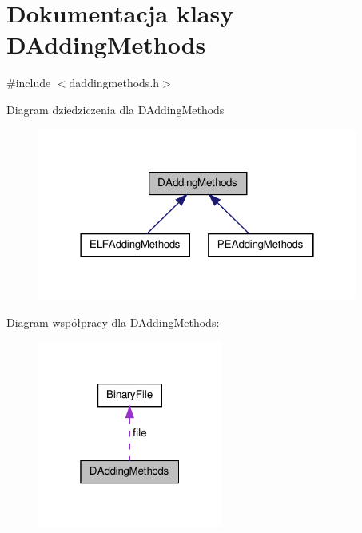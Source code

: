 \hypertarget{class_d_adding_methods}{\section{Dokumentacja klasy D\-Adding\-Methods}
\label{class_d_adding_methods}
}


{\ttfamily \#include $<$daddingmethods.\-h$>$}



Diagram dziedziczenia dla D\-Adding\-Methods\nopagebreak
\begin{figure}[H]
\begin{center}
\leavevmode
\includegraphics[width=298pt]{class_d_adding_methods__inherit__graph}
\end{center}
\end{figure}


Diagram współpracy dla D\-Adding\-Methods\-:\nopagebreak
\begin{figure}[H]
\begin{center}
\leavevmode
\includegraphics[width=172pt]{class_d_adding_methods__coll__graph}
\end{center}
\end{figure}
